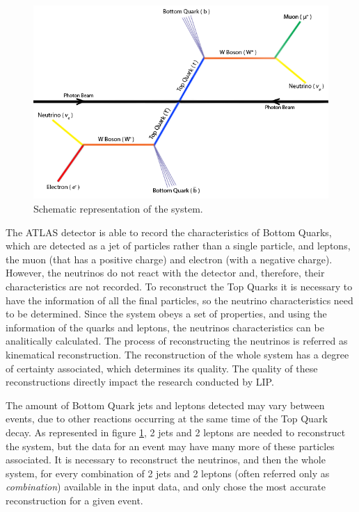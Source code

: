 \begin{figure}[!htp]
	\begin{center}
		\includegraphics[scale=0.5]{../../common/img/ttbar.png}
		\caption{Schematic representation of the \ttbar system.}
		\label{fig:TopQuarkDecay}
	\end{center}
\end{figure}

The ATLAS detector is able to record the characteristics of Bottom Quarks, which are detected as a jet of particles rather than a single particle, and leptons, the muon (that has a positive charge) and electron (with a negative charge). However, the neutrinos do not react with the detector and, therefore, their characteristics are not recorded. To reconstruct the Top Quarks it is necessary to have the information of all the final particles, so the neutrino characteristics need to be determined. Since the \ttbar system obeys a set of properties, and using the information of the quarks and leptons, the neutrinos characteristics can be analitically calculated. The process of reconstructing the neutrinos is referred as kinematical reconstruction. The reconstruction of the whole \ttbar system has a degree of certainty associated, which determines its quality. The quality of these reconstructions directly impact the research conducted by LIP.

The amount of Bottom Quark jets and leptons detected may vary between events, due to other reactions occurring at the same time of the Top Quark decay. As represented in figure \ref{fig:TopQuarkDecay}, 2 jets and 2 leptons are needed to reconstruct the \ttbar system, but the data for an event may have many more of these particles associated. It is necessary to reconstruct the neutrinos, and then the whole system, for every combination of 2 jets and 2 leptons (often referred only as \textit{combination}) available in the input data, and only chose the most accurate reconstruction for a given event.

